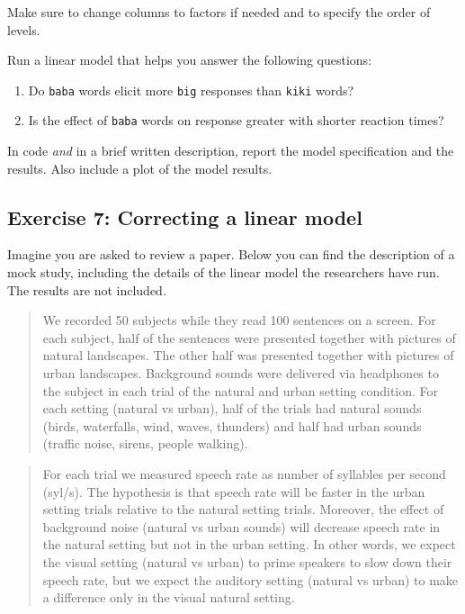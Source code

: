 \documentclass[
]{article}
\providecommand{\tightlist}{%
  \setlength{\itemsep}{0pt}\setlength{\parskip}{0pt}}
\begin{document}
Make sure to change columns to factors if needed and to specify the
order of levels.

Run a linear model that helps you answer the following questions:

\begin{enumerate}
\def\labelenumi{\arabic{enumi}.}
\tightlist
\item
  Do \texttt{baba} words elicit more \texttt{big} responses than
  \texttt{kiki} words?
\item
  Is the effect of \texttt{baba} words on response greater with shorter
  reaction times?
\end{enumerate}

In code \emph{and} in a brief written description, report the model
specification and the results. Also include a plot of the model results.

\hypertarget{exercise-7-correcting-a-linear-model}{%
\subsection{Exercise 7: Correcting a linear
model}\label{exercise-7-correcting-a-linear-model}}

Imagine you are asked to review a paper. Below you can find the
description of a mock study, including the details of the linear model
the researchers have run. The results are not included.

\begin{quote}
We recorded 50 subjects while they read 100 sentences on a screen. For
each subject, half of the sentences were presented together with
pictures of natural landscapes. The other half was presented together
with pictures of urban landscapes. Background sounds were delivered via
headphones to the subject in each trial of the natural and urban setting
condition. For each setting (natural vs urban), half of the trials had
natural sounds (birds, waterfalls, wind, waves, thunders) and half had
urban sounds (traffic noise, sirens, people walking).
\end{quote}

\begin{quote}
For each trial we measured speech rate as number of syllables per second
(syl/s). The hypothesis is that speech rate will be faster in the urban
setting trials relative to the natural setting trials. Moreover, the
effect of background noise (natural vs urban sounds) will decrease
speech rate in the natural setting but not in the urban setting. In
other words, we expect the visual setting (natural vs urban) to prime
speakers to slow down their speech rate, but we expect the auditory
setting (natural vs urban) to make a difference only in the visual
natural setting.
\end{quote}
\end{document}
